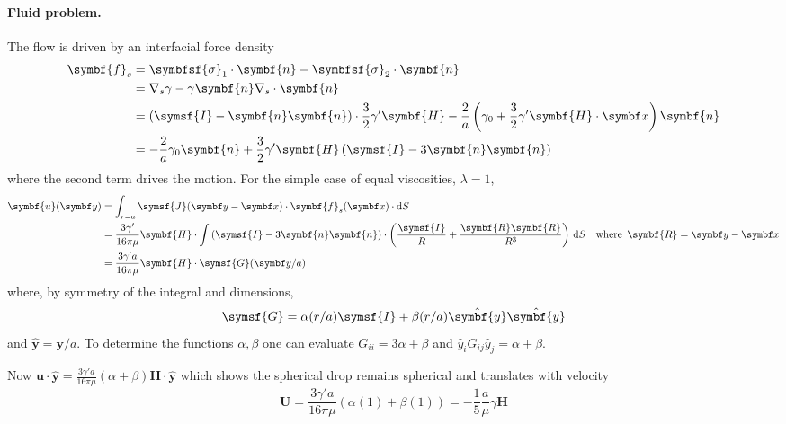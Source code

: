 \documentclass{jknotes}
\begin{document}
\paragraph{Fluid problem.}
The flow is driven by an interfacial force density 
\begin{align}
	\symbf{f}_s &= \symbfsf{\sigma}_1 \cdot \symbf{n} - \symbfsf{\sigma}_2 \cdot
	\symbf{n} \\
	&= \nabla_s \gamma - \gamma \symbf{n}\nabla_s \cdot \symbf{n} \\
	&= \left( \symsf{I}-\symbf{n}\symbf{n}\right) \cdot \frac{3}{2}\gamma'
	\symbf{H} - \frac{2}{a} \left( \gamma_0 + \frac{3}{2}\gamma'
	\symbf{H}\cdot\x\right)\symbf{n} \\
	&= -\frac{2}{a}\gamma_0 \symbf{n} + \frac{3}{2}\gamma'
	\symbf{H}\left(\symsf{I}-3\symbf{n}\symbf{n}\right)
\end{align}
where the second term drives the motion. For the simple case of equal
viscosities, $\lambda = 1$,
\begin{align}
	\symbf{u}(\y) &= \int_{r=a} \symsf{J}(\y-\x) \cdot \symbf{f}_s(\x) \cdot
	\diffd S \\
	&= \frac{3\gamma'}{16 \pi \mu} \symbf{H} \cdot \int \left(\symsf{I} - 3
	\symbf{n}\symbf{n}\right) \cdot \left( \frac{\symsf{I}}{R} +
	\frac{\symbf{R}\symbf{R}}{R^3}\right) \, \diffd S \hspace{1em}
	\text{where} \, \, \, \symbf{R} = \y - \x \\
	&= \frac{3 \gamma' a}{16 \pi \mu} \symbf{H} \cdot \symsf{G}(\y/a)
\end{align}
where, by symmetry of the integral and dimensions,
\begin{equation}
	\symsf{G} = \alpha(r/a) \symsf{I} + \beta(r/a)
	\hat{\symbf{y}} \hat{\symbf{y}}
\end{equation}
and $\hat{\symbf{y}} = \symbf{y}/a$. To determine the functions $\alpha,
\beta$ one can evaluate $G_{ii} = 3\alpha + \beta$ and $\hat{y}_i G_{ij}
\hat{y}_j = \alpha + \beta$. 

Now $\symbf{u} \cdot \hat{\symbf{y}} = \frac{3\gamma' a}{16 \pi \mu} (\alpha+\beta)
\symbf{H}\cdot\hat{\symbf{y}}$ which shows the spherical drop remains
spherical and translates with velocity
\begin{equation}
	\symbf{U} = \frac{3 \gamma' a}{16 \pi \mu} \left( \alpha(1) +
	\beta(1)\right) = -\frac{1}{5} \frac{a}{\mu} \gamma \symbf{H}
\end{equation}
\end{document}
